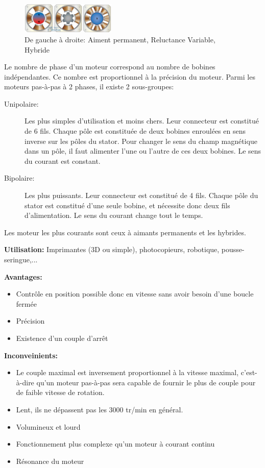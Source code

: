 \documentclass[a4paper, 11pt]{report}
\begin{document}
\begin{figure}[h!]
\begin{centering}
\includegraphics[width=0.4\textwidth]{images/DifferentsMPP.jpg}
\caption{De gauche à droite: Aiment permanent, Reluctance Variable, Hybride}
\par\end{centering}
\end{figure}

Le nombre de phase d'un moteur correspond au nombre de bobines indépendantes. Ce nombre est proportionnel à la précision du moteur.
Parmi les moteurs pas-à-pas à 2 phases, il existe 2 sous-groupes:
\begin{description}
\item[Unipolaire:]Les plus simples d'utilisation et moins chers. Leur connecteur est constitué de 6 fils. Chaque pôle est constituée de deux bobines enroulées en sens inverse sur les pôles du stator. Pour changer le sens du champ magnétique dans un pôle, il faut alimenter l'une ou l'autre de ces deux bobines. Le sens du courant est constant.
\item[Bipolaire:]Les plus puissants. Leur connecteur est constitué de 4 fils. Chaque pôle du stator est constitué d'une seule bobine, et nécessite donc deux fils d'alimentation. Le sens du courant change tout le temps.
\end{description}

Les moteur les plus courants sont ceux à aimants permanents et les hybrides.

\textbf{Utilisation:} Imprimantes (3D ou simple), photocopieurs, robotique, pousse-seringue,...

\textbf{Avantages:}
\begin{itemize}
\item Contrôle en position possible donc en vitesse sans avoir besoin d'une boucle fermée
\item Précision
\item Existence d'un couple d'arrêt
\end{itemize}

\textbf{Inconveinients:}
\begin{itemize}
\item Le couple maximal est inversement proportionnel à la vitesse maximal, c'est-à-dire qu'un moteur pas-à-pas sera capable de fournir le plus de couple pour de faible vitesse de rotation.
\item Lent, ils ne dépassent pas les 3000 tr/min en général.
\item Volumineux et lourd
\item Fonctionnement plus complexe qu'un moteur à courant continu
\item Résonance du moteur
\end{itemize}
\end{document}
